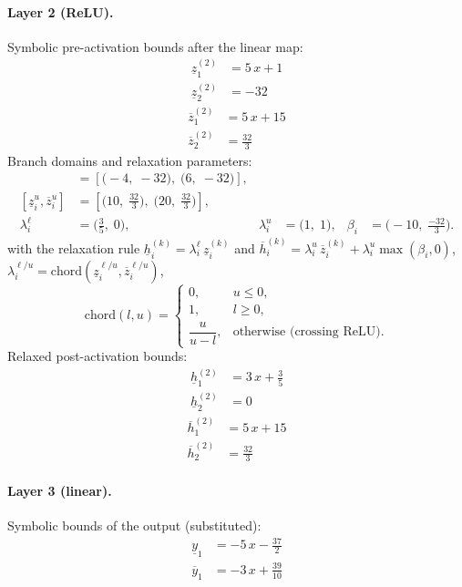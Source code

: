 \documentclass[11pt]{article}
\begin{document}
\paragraph{Layer 2 (ReLU).}
Symbolic pre-activation bounds after the linear map:
\begin{align*}
\underline{z}^{(2)}_{1} &= 5\,x + 1 \\
\underline{z}^{(2)}_{2} &= -32
\end{align*}
\begin{align*}
\overline{z}^{(2)}_{1} &= 5\,x + 15 \\
\overline{z}^{(2)}_{2} &= \frac{32}{3}
\end{align*}
Branch domains and relaxation parameters:
\begin{align*}
[\underline{z}^{\ell}_i, \overline{z}^{\ell}_i] &= [\bigl(-4,\; -32\bigr),\; \bigl(6,\; -32\bigr)], \\ 
[\underline{z}^{u}_i, \overline{z}^{u}_i] &= [\bigl(10,\; \frac{32}{3}\bigr),\; \bigl(20,\; \frac{32}{3}\bigr)], \\
\lambda^{\ell}_i &= \bigl(\frac{3}{5},\; 0\bigr), & \lambda^{u}_i &= \bigl(1,\; 1\bigr), & \beta_i &= \bigl(-10,\; \frac{-32}{3}\bigr).
\end{align*}
with the relaxation rule
$\underline{h}^{(k)}_i = \lambda^{\ell}_i\, \underline{z}^{(k)}_i$ and
$\overline{h}^{(k)}_i = \lambda^{u}_i\, \overline{z}^{(k)}_i + \lambda^{u}_i \max(\beta_i, 0)$,
$\lambda^{\ell/u}_i = \mathrm{chord}(\underline{z}_i^{\ell/u}, \overline{z}_i^{\ell/u})$,
\[
\mathrm{chord}(l, u) =
\begin{cases}
0, & u \le 0,\\
1, & l \ge 0,\\
\dfrac{u}{u - l}, & \text{otherwise (crossing ReLU)}.
\end{cases}\]
Relaxed post-activation bounds:
\begin{align*}
\underline{h}^{(2)}_{1} &= 3\,x + \frac{3}{5} \\
\underline{h}^{(2)}_{2} &= 0
\end{align*}
\begin{align*}
\overline{h}^{(2)}_{1} &= 5\,x + 15 \\
\overline{h}^{(2)}_{2} &= \frac{32}{3}
\end{align*}
\paragraph{Layer 3 (linear).}
Symbolic bounds of the output (substituted):
\begin{align*}
\underline{y}_{1} &= -5\,x - \frac{37}{2}
\end{align*}
\begin{align*}
\overline{y}_{1} &= -3\,x + \frac{39}{10}
\end{align*}
\end{document}
